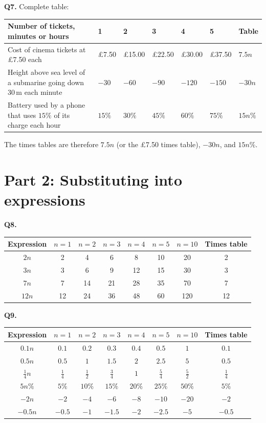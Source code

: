 \documentclass[11pt,a4paper]{article}
\begin{document}
\textbf{Q7.} Complete table:
\begin{center}\small
\begin{tabular}{|p{5.8cm}|*{5}{C{1.1cm}|}C{1.8cm}|}\hline
Number of tickets, minutes or hours & 1 & 2 & 3 & 4 & 5 & Table\\\hline
Cost of cinema tickets at \pounds7.50 each
& \pounds7.50 & \pounds15.00 & \pounds22.50 & \pounds30.00 & \pounds37.50 & \(7.5n\)\\\hline
Height above sea level of a submarine going down \(30\)\,m each minute
& \(-30\) & \(-60\) & \(-90\) & \(-120\) & \(-150\) & \(-30n\)\\\hline
Battery used by a phone that uses \(15\%\) of its charge each hour
& \(15\%\) & \(30\%\) & \(45\%\) & \(60\%\) & \(75\%\) & \(15n\%\)\\\hline
\end{tabular}
\end{center}
The times tables are therefore \(7.5n\) (or the \pounds7.50 times table), \(-30n\), and \(15n\%\).

\section*{Part 2: Substituting into expressions}

\textbf{Q8.}
\begin{center}\small
\begin{tabular}{|c|*{6}{c|}c|}\hline
Expression & \(n=1\) & \(n=2\) & \(n=3\) & \(n=4\) & \(n=5\) & \(n=10\) & Times table\\\hline
\(2n\) & 2 & 4 & 6 & 8 & 10 & 20 & 2\\
\(3n\) & 3 & 6 & 9 & 12 & 15 & 30 & 3\\
\(7n\) & 7 & 14 & 21 & 28 & 35 & 70 & 7\\
\(12n\) & 12 & 24 & 36 & 48 & 60 & 120 & 12\\\hline
\end{tabular}
\end{center}

\textbf{Q9.}
\begin{center}\small
\begin{tabular}{|c|*{6}{c|}c|}\hline
Expression & \(n=1\) & \(n=2\) & \(n=3\) & \(n=4\) & \(n=5\) & \(n=10\) & Times table\\\hline
\(0.1n\) & \(0.1\) & \(0.2\) & \(0.3\) & \(0.4\) & \(0.5\) & \(1\) & \(0.1\)\\
\(0.5n\) & \(0.5\) & \(1\) & \(1.5\) & \(2\) & \(2.5\) & \(5\) & \(0.5\)\\
\(\frac14n\) & \(\frac14\) & \(\frac12\) & \(\frac34\) & \(1\) & \(\frac54\) & \(\frac52\) & \(\frac14\)\\
\(5n\%\) & \(5\%\) & \(10\%\) & \(15\%\) & \(20\%\) & \(25\%\) & \(50\%\) & \(5\%\)\\
\(-2n\) & \(-2\) & \(-4\) & \(-6\) & \(-8\) & \(-10\) & \(-20\) & \(-2\)\\
\(-0.5n\) & \(-0.5\) & \(-1\) & \(-1.5\) & \(-2\) & \(-2.5\) & \(-5\) & \(-0.5\)\\\hline
\end{tabular}
\end{center}
\end{document}
